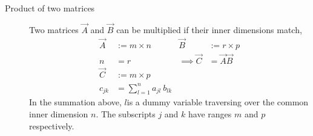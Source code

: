\begin{description}
    \item[Product of two matrices] Two matrices $ \vec{A} $ and $ \vec{B} $ can be
        multiplied if their inner dimensions match,
        \begin{align}
            \vec{A}          & := m \times n                   &
            \vec{B}          & := r \times p                     \\
            n                & = r                             &
            \implies \vec{C} & = \vec{A} \vec{B}                 \\
            \vec{C}          & := m \times p                     \\
            c_{jk}           & = \sum_{l=1}^{n} a_{jl}\ b_{lk}
        \end{align}
        In the summation above, $ l $is a dummy variable traversing over the common
        inner dimension $ n $. The subscripts $ j $ and $ k $ have ranges $ m $ and
        $ p $ respectively.


\end{description}
